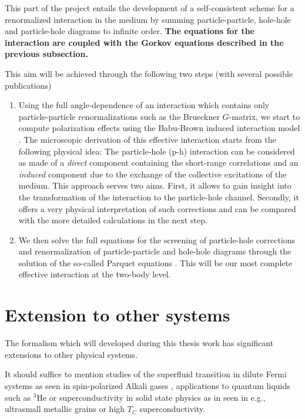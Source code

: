 \documentclass{svmult}
\begin{document}
This part of the project entails the development of a self-consistent
scheme for a renormalized interaction in the medium by summing
particle-particle, hole-hole and particle-hole diagrams to infinite order.
{\bf The equations for the interaction are coupled with the Gorkov equations
described in the previous subsection.}

This aim will be achieved through the following two steps (with several possible
publications)
\begin{enumerate}
 \item Using the full angle-dependence of an interaction which contains
       only particle-particle renormalizations such as the 
       Brueckner $G$-matrix, we start to compute 
       polarization effects using the  Babu-Brown induced interaction model 
       \cite{BABU,SJO73,BACK73,JACK82,DICK83,BACK85}. 
       The microscopic derivation 
       of this effective interaction starts from the following physical idea: 
       The particle-hole (p-h) interaction can be considered as made of a 
       {\em direct} component containing the short-range correlations and an 
       {\em induced} component due to the exchange of the collective excitations 
of the medium.
This approach serves two aims. First, it allows to gain insight into
the transformation of the interaction to the particle-hole channel. Secondly,
it offers a very physical interpretation of such corrections and can be compared 
with the more detailed calculations in the next step.
\item We then solve the full equations for the screening of particle-hole
corrections and renormalization of particle-particle and hole-hole
diagrams through the solution of 
the so-called Parquet equations \cite{JACK82,DICK83,mhj98}.
This will be our most complete effective interaction at the two-body 
level.
 \end{enumerate}
\section{Extension to other systems}
The formalism which will developed during this thesis
work has significant extensions to other physical systems.

It should suffice to mention studies of the superfluid transition
in dilute Fermi systems \cite{henning2000} as seen in 
spin-polarized Alkali gases \cite{stoof},
applications to quantum liquids
such as $^3$He \cite{glyde} or 
superconductivity in solid state physics as in seen in e.g., ultrasmall
metallic grains \cite{delft} or high $T_C$ superconductivity.
\end{document}
